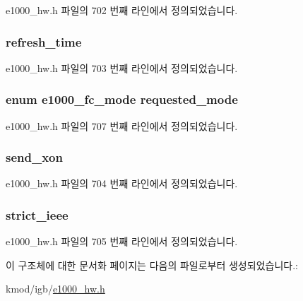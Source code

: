 e1000\+\_\+hw.\+h 파일의 702 번째 라인에서 정의되었습니다.

\subsubsection[{\texorpdfstring{refresh\+\_\+time}{refresh_time}}]{ refresh\+\_\+time}\hypertarget{structe1000__fc__info_a13b2e207bbd833df8f9832a62268d0ca}{}\label{structe1000__fc__info_a13b2e207bbd833df8f9832a62268d0ca}


e1000\+\_\+hw.\+h 파일의 703 번째 라인에서 정의되었습니다.

\subsubsection[{\texorpdfstring{requested\+\_\+mode}{requested_mode}}]{\setlength{\rightskip}{0pt plus 5cm}enum {\bf e1000\+\_\+fc\+\_\+mode} requested\+\_\+mode}\hypertarget{structe1000__fc__info_a563a5640b5e1e50ba7f733b658f1f356}{}\label{structe1000__fc__info_a563a5640b5e1e50ba7f733b658f1f356}


e1000\+\_\+hw.\+h 파일의 707 번째 라인에서 정의되었습니다.

\subsubsection[{\texorpdfstring{send\+\_\+xon}{send_xon}}]{ send\+\_\+xon}\hypertarget{structe1000__fc__info_a029854032b76190b8c61c989a8dacc5e}{}\label{structe1000__fc__info_a029854032b76190b8c61c989a8dacc5e}


e1000\+\_\+hw.\+h 파일의 704 번째 라인에서 정의되었습니다.

\subsubsection[{\texorpdfstring{strict\+\_\+ieee}{strict_ieee}}]{ strict\+\_\+ieee}\hypertarget{structe1000__fc__info_a45655a898feb7af877f7e18f414cf188}{}\label{structe1000__fc__info_a45655a898feb7af877f7e18f414cf188}


e1000\+\_\+hw.\+h 파일의 705 번째 라인에서 정의되었습니다.



이 구조체에 대한 문서화 페이지는 다음의 파일로부터 생성되었습니다.\+:\begin{DoxyCompactItemize}
\item 
kmod/igb/\hyperlink{kmod_2igb_2e1000__hw_8h}{e1000\+\_\+hw.\+h}\end{DoxyCompactItemize}
